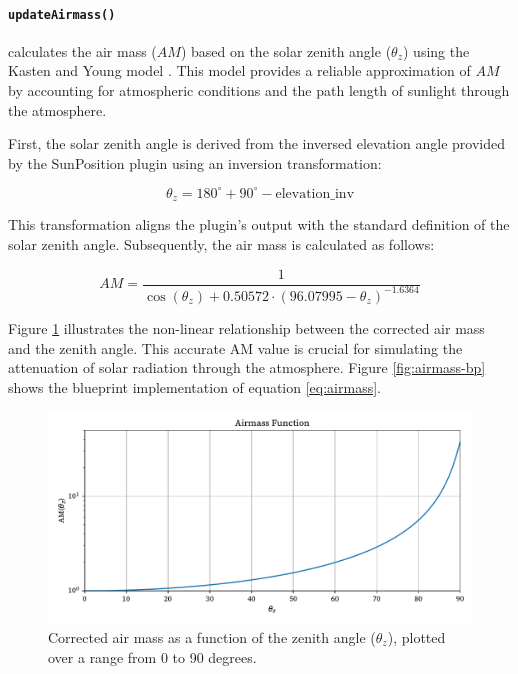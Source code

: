 \documentclass[draft, final]{vutinfth} %
\begin{document}
\paragraph{\lstinline|updateAirmass()|} calculates the air mass ($AM$) based on the solar zenith angle ($\theta_z$) using the Kasten and Young model \cite{Kasten1989airmass}. This model provides a reliable approximation of $AM$ by accounting for atmospheric conditions and the path length of sunlight through the atmosphere.

First, the solar zenith angle is derived from the inversed elevation angle provided by the SunPosition plugin using an inversion transformation:

\begin{equation} \label{eq:theta_z}
\theta_z = 180^\circ + 90^\circ - \text{elevation\_inv}
\end{equation}

This transformation aligns the plugin's output with the standard definition of the solar zenith angle. Subsequently, the air mass is calculated as follows:

\begin{equation} \label{eq:airmass}
AM = \frac{1}{\cos(\theta_z) + 0.50572 \cdot (96.07995 - \theta_z)^{-1.6364}}
\end{equation}

Figure \ref{fig:corrected-airmass} illustrates the non-linear relationship between the corrected air mass and the zenith angle. This accurate AM value is crucial for simulating the attenuation of solar radiation through the atmosphere. Figure \ref{fig:airmass-bp} shows the blueprint implementation of equation \ref{eq:airmass}.

\begin{figure}[h]
    \centering
    \includegraphics[width=\textwidth]{graphics/airmass.pdf}
    \caption{Corrected air mass as a function of the zenith angle ($\theta_z$), plotted over a range from 0 to 90 degrees.}
    \label{fig:corrected-airmass}
\end{figure}
\end{document}
